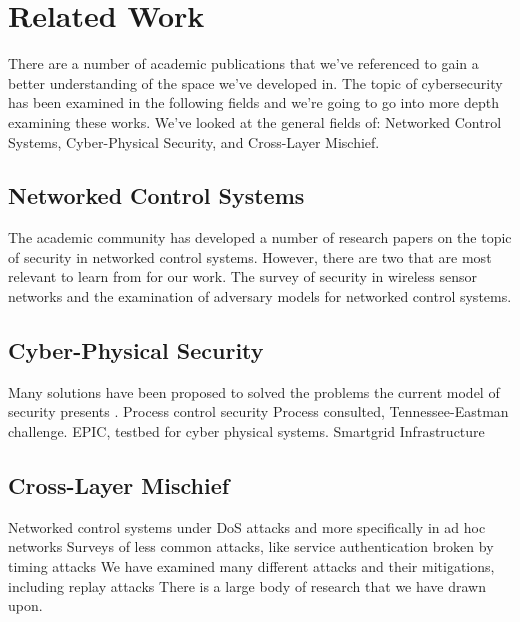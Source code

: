 \section{Related Work}
There are a number of academic publications that we've referenced to gain a better understanding of the space we've developed in.  The topic of cybersecurity has been examined in the following fields and we're going to go into more depth examining these works.  We've looked at the general fields of: Networked Control Systems, Cyber-Physical Security, and Cross-Layer Mischief. 
\subsection{Networked Control Systems}
The academic community has developed a number of research papers on the topic of security in networked control systems.  However, there are two that are most relevant to learn from for our work.  The survey of security in wireless sensor networks and the examination of adversary models for networked control systems. \cite{chen,cardenas}
\subsection{Cyber-Physical Security}
Many solutions have been proposed to solved the problems the current model of security presents \cite{mclaughlin, beitollahi}.  Process control security \cite{hashimoto}  Process consulted, Tennessee-Eastman challenge. \cite{ricker} EPIC, testbed for cyber physical systems. \cite{siaterlis}  Smartgrid Infrastructure \cite{mo}
\subsection{Cross-Layer Mischief}
Networked control systems under DoS attacks \cite{amin} and more specifically in ad hoc networks \cite{radosavac} Surveys of less common attacks, like service authentication broken by timing attacks\cite{hayes}
We have examined many different attacks and their mitigations, including replay attacks \cite{mosinopoli}
There is a large body of research that we have drawn upon.